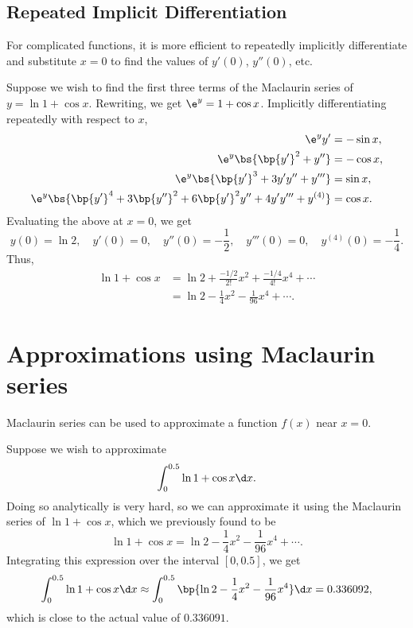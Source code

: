 \subsection{Repeated Implicit Differentiation}

For complicated functions, it is more efficient to repeatedly implicitly differentiate and substitute $x = 0$ to find the values of $y'(0)$, $y''(0)$, etc.

\begin{example}
    Suppose we wish to find the first three terms of the Maclaurin series of $y = \ln{1 + \cos x}$. Rewriting, we get $\e^y = 1 + \cos x$. Implicitly differentiating repeatedly with respect to $x$,
    \begin{align*}
        \e^y y' &= -\sin x,\\
        \e^y \bs{\bp{y'}^2 + y''} &= -\cos x,\\
        \e^y \bs{\bp{y'}^3 + 3y'y'' + y'''} &= \sin x, \\
        \e^y \bs{\bp{y'}^4 + 3\bp{y''}^2 + 6\bp{y'}^2 y'' + 4y'y''' + y^{(4)}} &= \cos x.
    \end{align*}
    Evaluating the above at $x = 0$, we get \[y(0) = \ln 2, \quad y'(0) = 0, \quad y''(0) = -\frac12, \quad y'''(0) = 0, \quad y^{(4)}(0) = -\frac14.\] Thus,
    \begin{align*}
        \ln{1 + \cos x} &= \ln 2 + \frac{-1/2}{2!} x^2 + \frac{-1/4}{4!} x^4 + \cdots\\
        &= \ln 2 - \frac14 x^2 - \frac1{96}x^4 + \cdots.
    \end{align*}
\end{example}

\section{Approximations using Maclaurin series}

Maclaurin series can be used to approximate a function $f(x)$ near $x = 0$.

\begin{example}
    Suppose we wish to approximate \[\int_0^{0.5} \ln{1 + \cos x} \d x.\] Doing so analytically is very hard, so we can approximate it using the Maclaurin series of $\ln{1 + \cos x}$, which we previously found to be \[\ln{1 + \cos x} = \ln 2 - \frac14 x^2 - \frac1{96}x^4 + \cdots.\] Integrating this expression over the interval $[0, 0.5]$, we get \[\int_0^{0.5} \ln{1 + \cos x} \d x \approx \int_0^{0.5} \bp{\ln 2 - \frac14 x^2 - \frac1{96}x^4} \d x = 0.336092,\] which is close to the actual value of $0.336091$.
\end{example}

